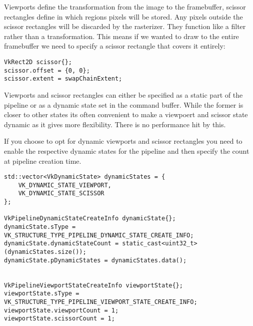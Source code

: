 \par Viewports define the transformation from the image to the framebuffer, scissor rectangles define in which regions pixels will be stored. Any pixels outside the scissor rectangles will be discarded by the rasterizer. They function like a filter rather than a transformation. This means if we wanted to draw to the entire framebuffer we need to specify a scissor rectangle that covers it entirely:

\begin{center}
\begin{minipage}{0.95\linewidth}
\begin{lstlisting}
VkRect2D scissor{};
scissor.offset = {0, 0};
scissor.extent = swapChainExtent;
\end{lstlisting}
\end{minipage}
\end{center}

\par Viewports and scissor rectangles can either be specified as a static part of the pipeline or as a dynamic state set in the command buffer. While the former is closer to other states its often convenient to make a viewpoert and scissor state dynamic as it gives more flexibility. There is no performance hit by this. 

\par If you choose to opt for dynamic viewports and scissor rectangles you need to enable the respective dynamic states for the pipeline and then specify the count at pipeline creation time.

\begin{center}
\begin{minipage}{0.95\linewidth}
\begin{lstlisting}
std::vector<VkDynamicState> dynamicStates = {
    VK_DYNAMIC_STATE_VIEWPORT,
    VK_DYNAMIC_STATE_SCISSOR
};

VkPipelineDynamicStateCreateInfo dynamicState{};
dynamicState.sType = VK_STRUCTURE_TYPE_PIPELINE_DYNAMIC_STATE_CREATE_INFO;
dynamicState.dynamicStateCount = static_cast<uint32_t>(dynamicStates.size());
dynamicState.pDynamicStates = dynamicStates.data();


VkPipelineViewportStateCreateInfo viewportState{};
viewportState.sType = VK_STRUCTURE_TYPE_PIPELINE_VIEWPORT_STATE_CREATE_INFO;
viewportState.viewportCount = 1;
viewportState.scissorCount = 1;
\end{lstlisting}
\end{minipage}
\end{center}

